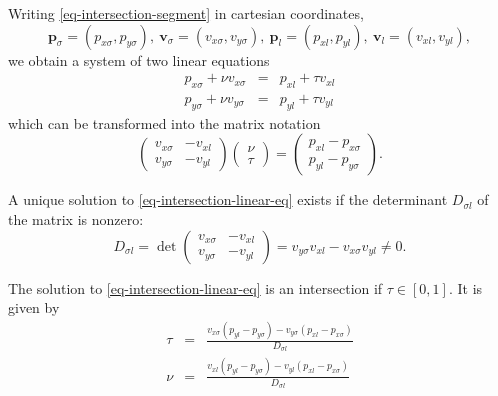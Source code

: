 \documentclass[11pt]{article}
\newcommand{\Dsigl}{D_{\sigma l}}
\newcommand{\pbl}{\mathbf{p}_l}
\newcommand{\pbsig}{\mathbf{p}_\sigma}
\newcommand{\pxl}{p_{xl}}
\newcommand{\pyl}{p_{yl}}
\newcommand{\pxsig}{p_{x\sigma}}
\newcommand{\pysig}{p_{y\sigma}}
\newcommand{\vbl}{\mathbf{v}_l}
\newcommand{\vxl}{v_{xl}}
\newcommand{\vyl}{v_{yl}}
\newcommand{\vbsig}{\mathbf{v}_\sigma}
\newcommand{\vxsig}{v_{x\sigma}}
\newcommand{\vysig}{v_{y\sigma}}
\begin{document}
Writing \eqref{eq-intersection-segment} in cartesian coordinates,
\begin{equation}
    \pbsig=(\pxsig, \pysig),\:
    \vbsig=(\vxsig, \vysig),\:
    \pbl=(\pxl, \pyl),\:
    \vbl=(\vxl, \vyl),\label{eq-intersection-cartesian}
\end{equation}
we obtain a system of two linear equations
\begin{eqnarray*}
    \pxsig + \nu \vxsig &=& \pxl + \tau \vxl \\
    \pysig + \nu \vysig &=& \pyl + \tau \vyl
\end{eqnarray*}
which can be transformed into the matrix notation
\begin{equation}
    \left(
        \begin{matrix}
            \vxsig & -\vxl \\ \vysig & -\vyl
        \end{matrix}
    \right)
    \left(
        \begin{matrix}
            \nu \\ \tau
        \end{matrix}
    \right)
    =
    \left(
        \begin{matrix}
            \pxl - \pxsig \\ \pyl - \pysig
        \end{matrix}
    \right).\label{eq-intersection-linear-eq}
\end{equation}

A unique solution to \eqref{eq-intersection-linear-eq} exists if the
determinant $\Dsigl$ of the matrix is nonzero:
\begin{equation}
    \Dsigl=\det\left(
        \begin{matrix}
            \vxsig & -\vxl \\ \vysig & -\vyl
        \end{matrix}
    \right)=
    \vysig\vxl - \vxsig\vyl \neq 0.\label{eq-intersection-determinant}
\end{equation}

The solution to \eqref{eq-intersection-linear-eq} is an intersection if
$\tau\in[0,1]$. It is given by
\begin{eqnarray}
\tau &=& \frac{\vxsig(\pyl - \pysig) - \vysig(\pxl - \pxsig)}{\Dsigl}
    \label{eq-intersection-tau}  \\
\nu &=& \frac{\vxl(\pyl-\pysig)-\vyl(\pxl-\pxsig)}{\Dsigl}
    \label{eq-intersection-nu}
\end{eqnarray}
\end{document}
